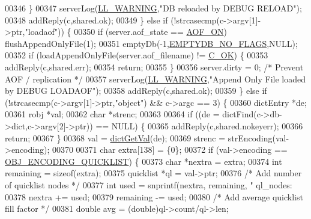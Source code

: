 \begin{DoxyCode}
{{{{00346         \}
00347         serverLog(\hyperlink{server_8h_a31229b9334bba7d6be2a72970967a14b}{LL\_WARNING},\textcolor{stringliteral}{"DB reloaded by DEBUG RELOAD"});
00348         addReply(c,shared.ok);
00349     \} \textcolor{keywordflow}{else} \textcolor{keywordflow}{if} (!strcasecmp(c->argv[1]->ptr,\textcolor{stringliteral}{"loadaof"})) \{
00350         \textcolor{keywordflow}{if} (server.aof\_state == \hyperlink{server_8h_af6b151c9dced28e94c19479197113a83}{AOF\_ON}) flushAppendOnlyFile(1);
00351         emptyDb(-1,\hyperlink{server_8h_a83a0ecde3a9f1f6bbcae9f4b966a509b}{EMPTYDB\_NO\_FLAGS},NULL);
00352         \textcolor{keywordflow}{if} (loadAppendOnlyFile(server.aof\_filename) != \hyperlink{server_8h_a303769ef1065076e68731584e758d3e1}{C\_OK}) \{
00353             addReply(c,shared.err);
00354             \textcolor{keywordflow}{return};
00355         \}
00356         server.dirty = 0; \textcolor{comment}{/* Prevent AOF / replication */}
00357         serverLog(\hyperlink{server_8h_a31229b9334bba7d6be2a72970967a14b}{LL\_WARNING},\textcolor{stringliteral}{"Append Only File loaded by DEBUG LOADAOF"});
00358         addReply(c,shared.ok);
00359     \} \textcolor{keywordflow}{else} \textcolor{keywordflow}{if} (!strcasecmp(c->argv[1]->ptr,\textcolor{stringliteral}{"object"}) && c->argc == 3) \{
00360         dictEntry *de;
00361         robj *val;
00362         \textcolor{keywordtype}{char} *strenc;
00363 
00364         \textcolor{keywordflow}{if} ((de = dictFind(c->db->dict,c->argv[2]->ptr)) == NULL) \{
00365             addReply(c,shared.nokeyerr);
00366             \textcolor{keywordflow}{return};
00367         \}
00368         val = \hyperlink{dict_8h_ae8d2cc391873b2bea2b87c4f80f43120}{dictGetVal}(de);
00369         strenc = strEncoding(val->encoding);
00370 
00371         \textcolor{keywordtype}{char} extra[138] = \{0\};
00372         \textcolor{keywordflow}{if} (val->encoding == \hyperlink{server_8h_aec792aeed6d4bf83966672e6a23043b8}{OBJ\_ENCODING\_QUICKLIST}) \{
00373             \textcolor{keywordtype}{char} *nextra = extra;
00374             \textcolor{keywordtype}{int} remaining = \textcolor{keyword}{sizeof}(extra);
00375             quicklist *ql = val->ptr;
00376             \textcolor{comment}{/* Add number of quicklist nodes */}
00377             \textcolor{keywordtype}{int} used = snprintf(nextra, remaining, \textcolor{stringliteral}{" ql\_nodes:%
00378             nextra += used;
00379             remaining -= used;
00380             \textcolor{comment}{/* Add average quicklist fill factor */}
00381             \textcolor{keywordtype}{double} avg = (\textcolor{keywordtype}{double})ql->count/ql->len;
}}}}}
\end{DoxyCode}
